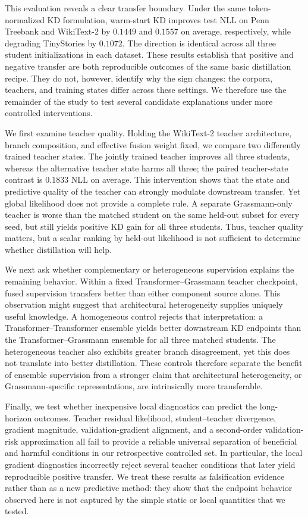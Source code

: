 This evaluation reveals a clear transfer boundary. Under the same token-normalized KD formulation, warm-start KD improves test NLL on Penn Treebank and WikiText-2 by $0.1449$ and $0.1557$ on average, respectively, while degrading TinyStories by $0.1072$. The direction is identical across all three student initializations in each dataset. These results establish that positive and negative transfer are both reproducible outcomes of the same basic distillation recipe. They do not, however, identify why the sign changes: the corpora, teachers, and training states differ across these settings. We therefore use the remainder of the study to test several candidate explanations under more controlled interventions.

We first examine teacher quality. Holding the WikiText-2 teacher architecture, branch composition, and effective fusion weight fixed, we compare two differently trained teacher states. The jointly trained teacher improves all three students, whereas the alternative teacher state harms all three; the paired teacher-state contrast is $0.1833$ NLL on average. This intervention shows that the state and predictive quality of the teacher can strongly modulate downstream transfer. Yet global likelihood does not provide a complete rule. A separate Grassmann-only teacher is worse than the matched student on the same held-out subset for every seed, but still yields positive KD gain for all three students. Thus, teacher quality matters, but a scalar ranking by held-out likelihood is not sufficient to determine whether distillation will help.

We next ask whether complementary or heterogeneous supervision explains the remaining behavior. Within a fixed Transformer--Grassmann teacher checkpoint, fused supervision transfers better than either component source alone. This observation might suggest that architectural heterogeneity supplies uniquely useful knowledge. A homogeneous control rejects that interpretation: a Transformer--Transformer ensemble yields better downstream KD endpoints than the Transformer--Grassmann ensemble for all three matched students. The heterogeneous teacher also exhibits greater branch disagreement, yet this does not translate into better distillation. These controls therefore separate the benefit of ensemble supervision from a stronger claim that architectural heterogeneity, or Grassmann-specific representations, are intrinsically more transferable.

Finally, we test whether inexpensive local diagnostics can predict the long-horizon outcomes. Teacher residual likelihood, student--teacher divergence, gradient magnitude, validation-gradient alignment, and a second-order validation-risk approximation all fail to provide a reliable universal separation of beneficial and harmful conditions in our retrospective controlled set. In particular, the local gradient diagnostics incorrectly reject several teacher conditions that later yield reproducible positive transfer. We treat these results as falsification evidence rather than as a new predictive method: they show that the endpoint behavior observed here is not captured by the simple static or local quantities that we tested.

